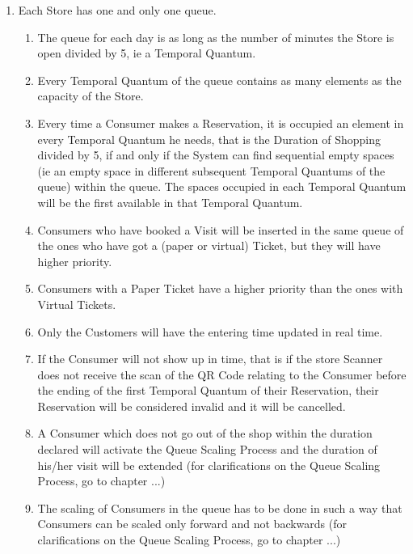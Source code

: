 \documentclass[a4paper, 10pt, oneside]{article}
\begin{document}
\begin{enumerate}[align=left]
    
    \item \label{req:queueUnique}Each Store has one and only one queue.
    \begin{enumerate}[label={-}]
        \item \label{req:codeUnique:queueVector} The queue for each day is as long as the number of minutes the Store is open divided by 5, ie a Temporal Quantum.
        \item \label{req:codeUnique:vectorOfVectors} Every Temporal Quantum of the queue contains as many elements as the capacity of the Store.
        \item \label{req:codeUnique:queueReservations} Every time a Consumer makes a Reservation, it is occupied an element in every Temporal Quantum he needs, that is the Duration of Shopping divided by 5, if and only if the System can find sequential empty spaces (ie an empty space in different subsequent Temporal Quantums of the queue) within the queue. The spaces occupied in each Temporal Quantum will be the first available in that Temporal Quantum.
        \item \label{req:codeUnique:visitsAndQueue} Consumers who have booked a Visit will be inserted in the same queue of the ones who have got a (paper or virtual) Ticket, but they will have higher priority.
        \item \label{req:codeUnique:ticketsAndQueue} Consumers with a Paper Ticket have a higher priority than the ones with Virtual Tickets.
        \item Only the Customers will have the entering time updated in real time. %
        \item \label{req:codeUnique:invalidateLate} If the Consumer will not show up in time, that is if the store Scanner does not receive the scan of the QR Code relating to the Consumer before the ending of the first Temporal Quantum of their Reservation, their Reservation will be considered invalid and it will be cancelled.
        \item \label{req:codeUnique:exeedDuration} A Consumer which does not go out of the shop within the duration declared will activate the Queue Scaling Process and the duration of his/her visit will be extended (for clarifications on the Queue Scaling Process, go to chapter ...)
        \item \label{req:codeUnique:queueScaling} The scaling of Consumers in the queue has to be done in such a way that Consumers can be scaled only forward and not backwards (for clarifications on the Queue Scaling Process, go to chapter ...)

\end{enumerate}
\end{enumerate}
\end{document}
